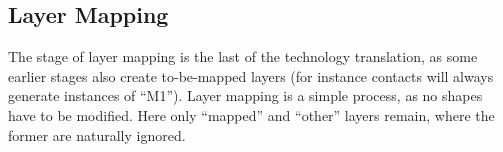 \subsection{Layer Mapping}
The stage of layer mapping is the last of the technology translation, as some earlier stages also create to-be-mapped layers (for instance contacts will always
generate instances of \enquote{M1}). Layer mapping is a simple process, as no shapes have to be modified. Here only \enquote{mapped} and \enquote{other} layers
remain, where the former are naturally ignored.



